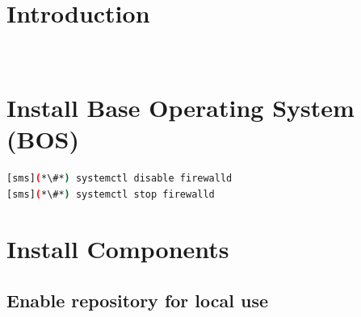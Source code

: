 \documentclass[letterpaper]{article}
\begin{document}
\graphicspath{{common/figures/}}
\thispagestyle{empty}


 

\newpage
\tableofcontents
\newpage


\section{Introduction} \label{sec:introduction}

 \\








\section{Install Base Operating System (BOS)}


\begin{lstlisting}[language=bash,keywords={}]
[sms](*\#*) systemctl disable firewalld
[sms](*\#*) systemctl stop firewalld
\end{lstlisting}


\section{Install \OHPC{} Components} \label{sec:basic_install}


\subsection{Enable \OHPC{} repository for local use} \label{sec:enable_repo}



\end{document}
